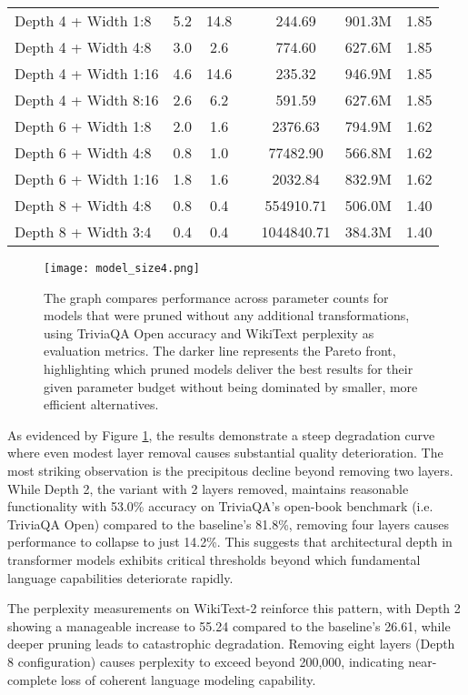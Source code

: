 {\begin{table}[!htbp]
\begin{tabular}{lcccccc}
Depth 4 + Width 1:8 & 5.2 & 14.8 & & 244.69 & 901.3M & 1.85 \\
Depth 4 + Width 4:8 & 3.0 & 2.6 & & 774.60 & 627.6M & 1.85 \\
Depth 4 + Width 1:16 & 4.6 & 14.6 & & 235.32 & 946.9M & 1.85 \\
Depth 4 + Width 8:16 & 2.6 & 6.2 & & 591.59 & 627.6M & 1.85 \\
Depth 6 + Width 1:8 & 2.0 & 1.6 & & 2376.63 & 794.9M & 1.62 \\
Depth 6 + Width 4:8 & 0.8 & 1.0 & & 77482.90 & 566.8M & 1.62 \\
Depth 6 + Width 1:16 & 1.8 & 1.6 & & 2032.84 & 832.9M & 1.62 \\
Depth 8 + Width 4:8 & 0.8 & 0.4 & & 554910.71 & 506.0M & 1.40 \\
Depth 8 + Width 3:4 & 0.4 & 0.4 & & 1044840.71 & 384.3M & 1.40 \\

\hline
\end{tabular}
\end{table}
}



\begin{figure}[!htbp]
    \centering
    \texttt{[image: model\_size4.png]}
    \caption[Comparison of Pruned Models]{The graph compares performance across parameter counts for models that were pruned without any additional transformations, using TriviaQA Open accuracy and WikiText perplexity as evaluation metrics. The darker line represents the Pareto front, highlighting which pruned models deliver the best results for their given parameter budget without being dominated by smaller, more efficient alternatives.}
    \label{fig:graph_size}
\end{figure}

As evidenced by Figure \ref{fig:graph_size}, the results demonstrate a steep degradation curve where even modest layer removal causes substantial quality deterioration. The most striking observation is the precipitous decline beyond removing two layers. While Depth 2, the variant with 2 layers removed, maintains reasonable functionality with 53.0\% accuracy on TriviaQA's open-book benchmark (i.e. TriviaQA Open) compared to the baseline's 81.8\%, removing four layers causes performance to collapse to just 14.2\%. This suggests that architectural depth in transformer models exhibits critical thresholds beyond which fundamental language capabilities deteriorate rapidly.

The perplexity measurements on WikiText-2 reinforce this pattern, with Depth 2 showing a manageable increase to 55.24 compared to the baseline's 26.61, while deeper pruning leads to catastrophic degradation. Removing eight layers (Depth 8 configuration) causes perplexity to exceed beyond 200,000, indicating near-complete loss of coherent language modeling capability.

